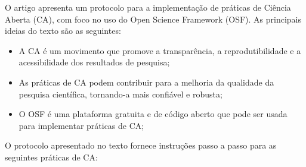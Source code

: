 \documentclass[
  a4paper,
]{article}
\begin{document}
\begin{tcolorbox}[enhanced jigsaw, leftrule=.75mm, left=2mm, toprule=.15mm, opacitybacktitle=0.6, colback=white, titlerule=0mm, colbacktitle=quarto-callout-note-color!10!white, bottomtitle=1mm, bottomrule=.15mm, opacityback=0, rightrule=.15mm, toptitle=1mm, title=\textcolor{quarto-callout-note-color}{\faInfo}\hspace{0.5em}{@sullivan2019 \emph{Reading Note}}, colframe=quarto-callout-note-color-frame, arc=.35mm, breakable, coltitle=black]

O artigo apresenta um protocolo para a implementação de práticas de
Ciência Aberta (CA), com foco no uso do Open Science Framework (OSF). As
principais ideias do texto são as seguintes:

\begin{itemize}
\item
  A CA é um movimento que promove a transparência, a reprodutibilidade e
  a acessibilidade dos resultados de pesquisa;
\item
  As práticas de CA podem contribuir para a melhoria da qualidade da
  pesquisa científica, tornando-a mais confiável e robusta;
\item
  O OSF é uma plataforma gratuita e de código aberto que pode ser usada
  para implementar práticas de CA;
\end{itemize}

O protocolo apresentado no texto fornece instruções passo a passo para
as seguintes práticas de CA:


\end{tcolorbox}
\end{document}
